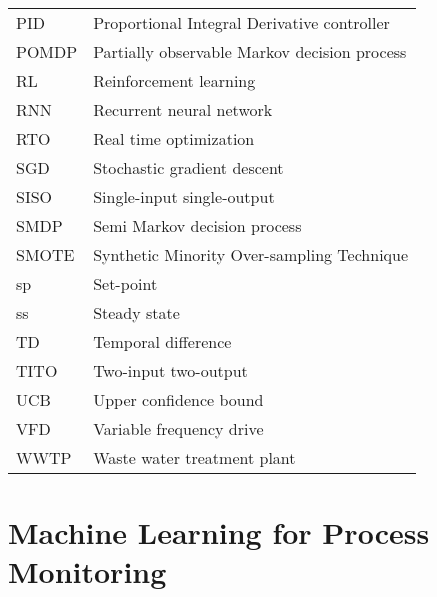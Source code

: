 \documentclass[12pt]{report}
\begin{document}
\newpage
\begin{tabular}{@{}ll}
PID & Proportional Integral Derivative controller \\
POMDP & Partially observable Markov decision process \\
RL & Reinforcement learning \\
RNN & Recurrent neural network \\
RTO & Real time optimization \\
SGD & Stochastic gradient descent \\
SISO & Single-input single-output \\
SMDP & Semi Markov decision process \\
SMOTE & Synthetic Minority Over-sampling Technique \\
sp & Set-point \\
ss & Steady state \\
TD & Temporal difference \\
TITO & Two-input two-output \\
UCB & Upper confidence bound \\
VFD & Variable frequency drive \\
WWTP & Waste water treatment plant \\
\end{tabular}

% 

% 

\chapter{Machine Learning for Process Monitoring}


% 
\end{document}
